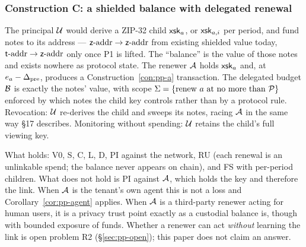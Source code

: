 \subsubsection{Construction C: a shielded balance with delegated renewal}

\begin{construction}
\label{con:pp-c}
The principal $\mathcal{U}$ would derive a ZIP-32 child $\mathsf{xsk}_{a}$, or
$\mathsf{xsk}_{a,i}$ per period, and fund notes to its address --- $\mathsf{z}\text{-addr} \to \mathsf{z}\text{-addr}$ from
existing shielded value today, $\mathsf{t}\text{-addr} \to \mathsf{z}\text{-addr}$ only once P1 is lifted. The ``balance'' is the
value of those notes and exists nowhere as protocol state. The renewer $\mathcal{A}$ holds
$\mathsf{xsk}_{a}$ and, at $e_{a} - \Delta_{\mathrm{pre}}$, produces a
Construction~\ref{con:pp-a} transaction. The delegated budget $\mathcal{B}$ is exactly the notes' value,
with scope $\Sigma = \{\text{renew }a\text{ at no more than }\mathcal{P}\}$ enforced by which notes
the child key controls rather than by a protocol rule. Revocation: $\mathcal{U}$ re-derives the child
and sweeps its notes, racing $\mathcal{A}$ in the same way \S17 describes. Monitoring without spending:
$\mathcal{U}$ retains the child's full viewing key.
\end{construction}

What holds: V0, S, C, L, D, PI against the network, RU (each renewal is an unlinkable spend; the
balance never appears on chain), and FS with per-period children. What does not hold is PI against
$\mathcal{A}$, which holds the key and therefore the link. When $\mathcal{A}$ is the tenant's own agent this is
not a loss and Corollary~\ref{cor:pp-agent} applies. When $\mathcal{A}$ is a third-party renewer acting for
human users, it is a privacy trust point exactly as a custodial balance is, though with bounded
exposure of funds. Whether a renewer can act \emph{without} learning the link is open problem R2
(\S\ref{sec:pp-open}); this paper does not claim an answer.


